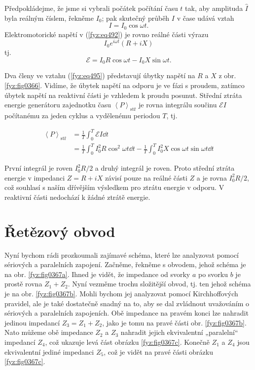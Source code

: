   Předpokládejme, že jsme si vybrali počátek počítání času \(t\) tak, aby amplituda \(\hat{I}\) 
  byla reálným číslem, řekněme \(I_0\); pak skutečný průběh \(I\) v čase udává vztah
  \begin{equation}\label{fyz:eq494}
  I = I_0\cos\omega t.
  \end{equation}
  Elektromotorické napětí v (\ref{fyz:eq492}) je rovno reálné části výrazu
  \begin{equation*}
    I_0e^{i\omega t}(R + iX)
  \end{equation*}
  tj.
  \begin{equation}\label{fyz:eq495}
    \mathscr{E} = I_0R\cos\omega t - I_0X\sin\omega t.
  \end{equation}
  
  Dva členy ve vztahu (\ref{fyz:eq495}) představují úbytky napětí na \(R\) a \(X\) z obr. 
  \ref{fyz:fig0366}. Vidíme, že úbytek napětí na odporu je ve fázi s proudem, zatímco úbytek napětí 
  na reaktivní části je vzhledem k proudu posunut. Střední ztráta energie generátoru zajednotku 
  času \(\left\langle P\right\rangle_{\text{stř}}\) je rovna integrálu součinu \(\mathscr{E}I\) 
  počítanému za jeden cyklus a vydělenému periodou \(T\), tj.
  
  \begin{align*}
    \left\langle P\right\rangle_{\text{stř}} 
      &= \frac{1}{T}\int_0^T\mathscr{E}I\dd{t}             \\
      &= \frac{1}{T}\int_0^TI_0^2R\cos^2\omega t\dd{t}     
       - \frac{1}{T}\int_0^TI_0^2X\cos\omega t\sin\omega t\dd{t}
  \end{align*}
  
  První integrál je roven \(I_0^2R/2\) a druhý integrál je roven. Proto střední ztráta energie 
  v impedanci \(Z= R+iX\) závisí pouze na reálné části \(Z\) a je rovna \(I_0^2R/2\), což souhlasí 
  s naším dřívějším výsledkem pro ztrátu energie v odporu. V reaktivní části nedochází k žádné 
  ztrátě energie.
  
\section{Řetězový obvod}\label{fyz:IIchapXXIIsecVI}
  Nyní bychom rádi prozkoumali zajímavé schéma, které lze analyzovat pomocí sériových a paralelních 
  zapojení. Začněme, řekněme s obvodem, jehož schéma je na obr. \ref{fyz:fig0367a}. Ihned je vidět, 
  že impedance od svorky \(a\) po svorku \(b\) je prostě rovna \(Z_1 + Z_2\). Nyní vezměme trochu 
  složitější obvod, tj. ten jehož schéma je na obr. \ref{fyz:fig0367b}. Mohli bychom jej analyzovat 
  pomocí Kirchhoffových pravidel, ale je také dostatečně snadný na to, aby se dal zvládnout 
  uvažováním o sériových a paralelních zapojeních. Obě impedance na pravém konci lze nahradit 
  jedinou impedancí \(Z_3 = Z_1 + Z_2\), jako je tomu na pravé části obr. \ref{fyz:fig0367b}. Nato 
  můžeme obě impedance \(Z_2\) a \(Z_3\) nahradit jejich ekvivalentní „paralelní“ impedancí 
  \(Z_4\), což ukazuje levá část obrázku \ref{fyz:fig0367c}. Konečně \(Z_1\) a \(Z_4\) jsou 
  ekvivalentní jediné impedanci \(Z_5\), což je vidět na pravé části obrázku \ref{fyz:fig0367c}.

